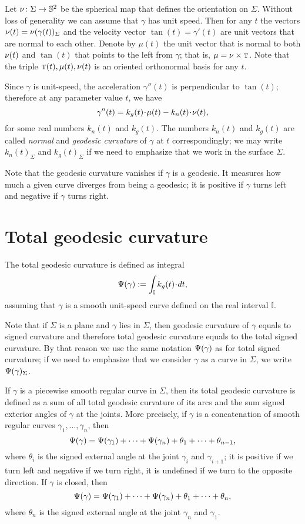 
Let $\nu\colon\Sigma\to \mathbb{S}^2$ be the spherical map that defines the orientation on $\Sigma$.
Without loss of generality we can assume that $\gamma$ has unit speed.
Then for any $t$ the vectors $\nu(t)=\nu(\gamma(t))_\Sigma$ and the velocity vector $\tan(t)=\gamma'(t)$ are unit vectors that are normal to each other.
Denote by $\mu(t)$ the unit vector that is normal to both $\nu(t)$ and $\tan(t)$ that points to the left from $\gamma$; that is, $\mu=\nu\times \textsc{t}$.
Note that the triple $\textsc{t}(t),\mu(t),\nu(t)$ is an oriented orthonormal basis for any $t$.

Since $\gamma$ is unit-speed, the acceleration $\gamma''(t)$ is perpendicular to $\tan(t)$;
therefore at any parameter value $t$, we have
\[\gamma''(t)=k_g(t)\cdot \mu(t)-k_n(t)\cdot \Norm(t),\]
for some real numbers $k_n(t)$ and $k_g(t)$.
The numbers $k_n(t)$ and $k_g(t)$ are called \emph{normal} and \emph{geodesic curvature} of $\gamma$ at $t$ correspondingly;
we may write $k_n(t)_\Sigma$ and $k_g(t)_\Sigma$ if we need to emphasize that we work in the surface $\Sigma$.

Note that the geodesic curvature vanishes if $\gamma$ is a geodesic. 
It measures how much a given curve diverges from being a geodesic;
it is positive if $\gamma$ turns left and negative if $\gamma$ turns right.

\section*{Total geodesic curvature}

The total geodesic curvature is defined as integral 
\[\tgc\gamma\df \int_{\mathbb{I}} k_g(t)\cdot dt,\]
assuming that $\gamma$ is a smooth unit-speed curve defined on the real interval $\mathbb{I}$.

Note that if $\Sigma$ is a plane and $\gamma$ lies in $\Sigma$, then geodesic curvature of $\gamma$ equals to signed curvature and therefore total geodesic curvature equals to the total signed curvature.
By that reason we use the same notation $\Psi({\gamma})$ as for total signed curvature; if we need to emphasize that we consider $\gamma$ as a curve in $\Sigma$, we write $\Psi({\gamma})_\Sigma$.

If $\gamma$ is a piecewise smooth regular curve in $\Sigma$, then
its total geodesic curvature is defined as a sum of all total geodesic curvature of its arcs and the sum signed exterior angles of $\gamma$ at the joints.
More precisely, if $\gamma$ is a concatenation of smooth regular curves $\gamma_1,\dots,\gamma_n$, then
\[\Psi({\gamma})=\Psi({\gamma_1})+\dots+\Psi({\gamma_n})+\theta_1+\dots+\theta_{n-1},\]
where $\theta_i$ is the signed external angle at the joint $\gamma_i$ and $\gamma_{i+1}$; it is positive if we turn left and negative if we turn right, it is undefined if we turn to the opposite direction.
If $\gamma$ is closed, then 
\[\Psi({\gamma})=\Psi({\gamma_1})+\dots+\Psi({\gamma_n})+\theta_1+\dots+\theta_{n},\]
where $\theta_n$ is the signed external angle at the joint $\gamma_n$ and $\gamma_1$.

